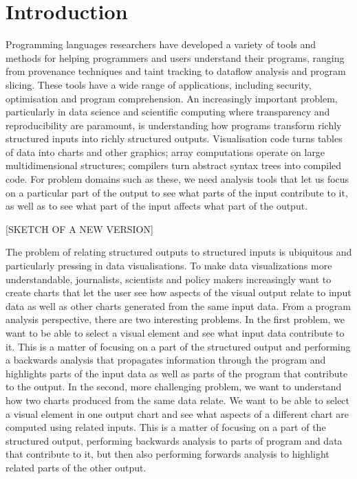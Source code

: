 \section{Introduction}

Programming languages researchers have developed a variety of tools and methods for helping programmers and users understand their programs, ranging from provenance techniques and taint tracking to dataflow analysis and program slicing. These tools have a wide range of applications, including security, optimisation and program comprehension. An increasingly important problem, particularly in data science and scientific computing where transparency and reproducibility are paramount, is understanding how programs transform richly structured inputs into richly structured outputs. Visualisation code turns tables of data into charts and other graphics; array computations operate on large multidimensional structures; compilers turn abstract syntax trees into compiled code. For problem domains such as these, we need analysis tools that let us focus on a particular part of the output to see what parts of the input contribute to it, as well as to see what part of the input affects what part of the output. 

[SKETCH OF A NEW VERSION]

The problem of relating structured outputs to structured inputs is ubiquitous and particularly pressing in data visualisations. To make data visualizations more understandable, journalists, scientists and policy makers increasingly want to create charts that let the user see how aspects of the visual output relate to input data as well as other charts generated from the same input data. From a program analysis perspective, there are two interesting problems. In the first problem, we want to be able to select a visual element and see what input data contribute to it. This is a matter of focusing on a part of the structured output and performing a backwards analysis that propagates information through the program and highlights parts of the input data as well as parts of the program that contribute to the output. In the second, more challenging problem, we want to understand how two charts produced from the same data relate. We want to be able to select a visual element in one output chart and see what aspects of a different chart are computed using related inputs. This is a matter of focusing on a part of the structured output, performing backwards analysis to parts of program and data that contribute to it, but then also performing forwards analysis to highlight related parts of the other output.

